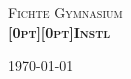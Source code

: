 \begin{titlepage}

\begin{center}



\textsc{\LARGE Fichte Gymnasium}\\[1.5cm]




\textsc{ \huge \bfseries \raisebox{0pt}[0pt][0pt]{Inst\/\raisebox{-0.2ex}{A}\raisebox{-0.4ex}{B}\raisebox{0.1ex}{I}\/l}}




\vfill

{\large \today}

\end{center}

\end{titlepage}
